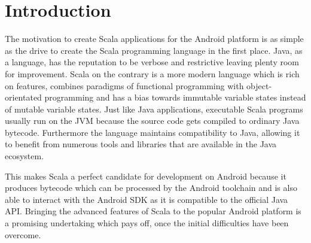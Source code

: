 \section{Introduction}

The motivation to create Scala applications for the Android platform is as simple as the drive to create the Scala 
programming language in the first place. Java, as a language, has the reputation to be verbose and restrictive leaving 
plenty room for improvement. Scala on the contrary is a more modern language which is rich on features, combines 
paradigms of functional programming with object-orientated programming and has a bias towards immutable variable states
instead of mutable variable states. Just like Java applications, executable Scala programs usually run on the \ac{JVM}
because the source code gets compiled to ordinary Java bytecode. Furthermore the language maintains compatibility to
Java, allowing it to benefit from numerous tools and libraries that are available in the Java ecosystem.

This makes Scala a perfect candidate for development on Android because it produces bytecode which can be processed by
the Android toolchain and is also able to interact with the Android \ac{SDK} as it is compatible to the official Java
\ac{API}. Bringing the advanced features of Scala to the popular Android platform is a promising undertaking which pays
off, once the initial difficulties have been overcome.